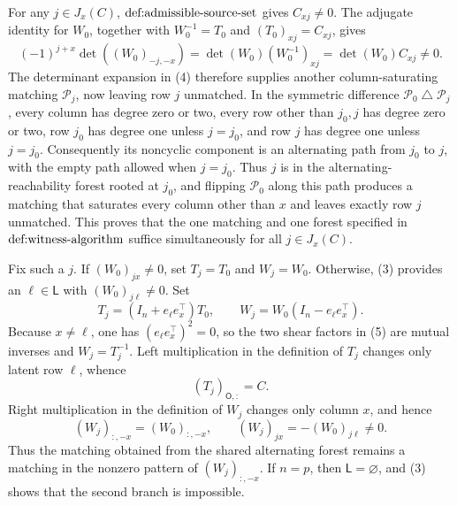For any \(j\in J_x(C)\), \(\textnormal{def:admissible-source-set}\) gives \(C_{xj}\ne0\).  The adjugate identity for \(W_0\), together with \(W_0^{-1}=T_0\) and \((T_0)_{xj}=C_{xj}\), gives
\[
 (-1)^{j+x}\det((W_0)_{-j,-x})
 =\det(W_0)(W_0^{-1})_{xj}
 =\det(W_0)C_{xj}\ne0.                                                      \tag{4}
\]
The determinant expansion in (4) therefore supplies another column-saturating matching \(\mathcal P_j\), now leaving row \(j\) unmatched.  In the symmetric difference \(\mathcal P_0\mathbin{\triangle}\mathcal P_j\), every column has degree zero or two, every row other than \(j_0,j\) has degree zero or two, row \(j_0\) has degree one unless \(j=j_0\), and row \(j\) has degree one unless \(j=j_0\).  Consequently its noncyclic component is an alternating path from \(j_0\) to \(j\), with the empty path allowed when \(j=j_0\).  Thus \(j\) is in the alternating-reachability forest rooted at \(j_0\), and flipping \(\mathcal P_0\) along this path produces a matching that saturates every column other than \(x\) and leaves exactly row \(j\) unmatched.  This proves that the one matching and one forest specified in \(\textnormal{def:witness-algorithm}\) suffice simultaneously for all \(j\in J_x(C)\).

Fix such a \(j\).  If \((W_0)_{jx}\ne0\), set \(T_j=T_0\) and \(W_j=W_0\).  Otherwise, (3) provides an \(\ell\in\mathsf L\) with \((W_0)_{j\ell}\ne0\).  Set
\[
 T_j=(I_n+e_\ell e_x^\top)T_0,
 \qquad
 W_j=W_0(I_n-e_\ell e_x^\top).                                             \tag{5}
\]
Because \(x\ne\ell\), one has \((e_\ell e_x^\top)^2=0\), so the two shear factors in (5) are mutual inverses and \(W_j=T_j^{-1}\).  Left multiplication in the definition of \(T_j\) changes only latent row \(\ell\), whence
\[
 (T_j)_{\mathsf O,:}=C.                                                     \tag{6}
\]
Right multiplication in the definition of \(W_j\) changes only column \(x\), and hence
\[
 (W_j)_{:,-x}=(W_0)_{:,-x},
 \qquad
 (W_j)_{jx}=-(W_0)_{j\ell}\ne0.                                            \tag{7}
\]
Thus the matching obtained from the shared alternating forest remains a matching in the nonzero pattern of \((W_j)_{:,-x}\).  If \(n=p\), then \(\mathsf L=\varnothing\), and (3) shows that the second branch is impossible.

